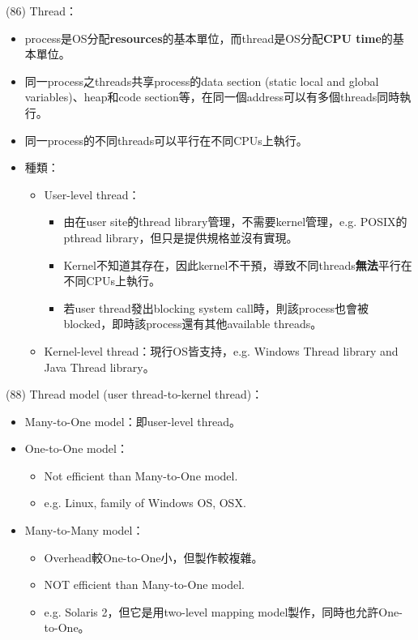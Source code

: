 \begin{theorem}{(86)} Thread：\begin{itemize}
        \item process是OS分配\textbf{resources}的基本單位，而thread是OS分配\textbf{CPU time}的基本單位。
        \item 同一process之threads共享process的data section (static local and global variables)、heap和code section等，在同一個address可以有多個threads同時執行。
        \item 同一process的不同threads可以平行在不同CPUs上執行。
        \item 種類：\begin{itemize}
            \item User-level thread：\begin{itemize}
                \item 由在user site的thread library管理，不需要kernel管理，e.g. POSIX的pthread library，但只是提供規格並沒有實現。
                \item Kernel不知道其存在，因此kernel不干預，導致不同threads\textbf{無法}平行在不同CPUs上執行。
                \item 若user thread發出blocking system call時，則該process也會被blocked，即時該process還有其他available threads。
            \end{itemize}
            \item Kernel-level thread：現行OS皆支持，e.g. Windows Thread library and Java Thread library。
        \end{itemize}
    \end{itemize}
\end{theorem}

\begin{theorem}{(88)} Thread model (user thread-to-kernel thread)：\begin{itemize}
        \item Many-to-One model：即user-level thread。
        \item One-to-One model：\begin{itemize}
            \item Not efficient than Many-to-One model.
            \item e.g. Linux, family of Windows OS, OSX.
        \end{itemize}
        \item Many-to-Many model：\begin{itemize}
            \item Overhead較One-to-One小，但製作較複雜。
            \item NOT efficient than Many-to-One model.
            \item e.g. Solaris 2，但它是用two-level mapping model製作，同時也允許One-to-One。
        \end{itemize}
    \end{itemize}
\end{theorem}
